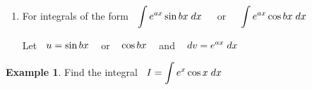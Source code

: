 \documentclass[11pt,a4paper]{article}
\theoremstyle{definition}
\newtheorem{exa}[thm]{Example}
\begin{document}
\begin{enumerate}
Let $\hspace{0.2cm} u = \ln x \hspace{0.3cm} , \hspace{0.3cm} \sin^{-1}kx\hspace{0.3cm}$ or $\hspace{0.3cm} \cos^{-1}kx\hspace{0.3cm}$ or $\hspace{0.3cm} \tan^{-1}kx\hspace{0.3cm}$ and $\hspace{0.3cm} dv = x^n\hspace{0.1cm}dx$

\item For integrals of the form $\hspace{0.2cm} \displaystyle{\int e^{ax}\sin bx\hspace{0.1cm}dx}\hspace{0.4cm} $ or $\hspace{0.4cm}\displaystyle{\int e^{ax}\cos bx\hspace{0.1cm}dx}$

Let $\hspace{0.2cm} u = \sin bx\hspace{0.3cm}$ or $\hspace{0.3cm} \cos bx\hspace{0.3cm}$ and $\hspace{0.3cm} dv = \displaystyle{e^{ax}\hspace{0.1cm}dx}$
\end{enumerate}

\begin{exa}


Find the integral $\hspace{0.2cm}\displaystyle{I  = \int e^x\cos x \hspace{0.1cm}dx}$
\end{exa}
\end{document}
